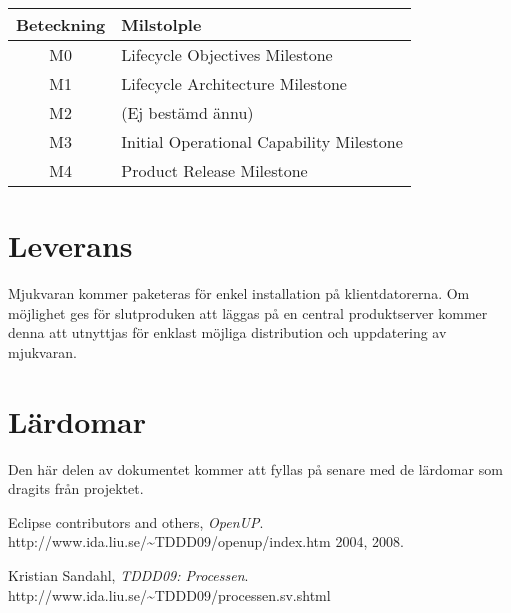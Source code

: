 \begin{center}
	\begin{tabular}{| c | l |}
		\hline
		Beteckning & Milstolple \\
		\hline
		M0 & Lifecycle Objectives Milestone \\
		\hline
		M1 & Lifecycle Architecture Milestone \\
		\hline
		M2 & (Ej bestämd ännu) \\
		\hline
		M3 & Initial Operational Capability Milestone \\
		\hline
		M4 & Product Release Milestone \\
		\hline
	\end{tabular}
\end{center}

\section{Leverans}
Mjukvaran kommer paketeras för enkel installation på klientdatorerna. Om möjlighet ges för slutproduken att läggas på en central produktserver kommer denna att utnyttjas för enklast möjliga distribution och uppdatering av mjukvaran.

\section{Lärdomar}
Den här delen av dokumentet kommer att fyllas på senare med de lärdomar som dragits från projektet.

\begin{thebibliography}{9}
	Eclipse contributors and others,
	\emph{OpenUP}.
	http://www.ida.liu.se/\~{}TDDD09/openup/index.htm
	2004, 2008.

	Kristian Sandahl,
	\emph{TDDD09: Processen}.
	http://www.ida.liu.se/\~{}TDDD09/processen.sv.shtml
\end{thebibliography}



